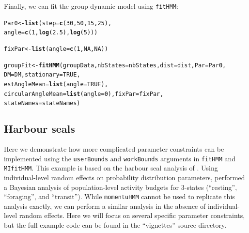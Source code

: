\documentclass[12pt]{article}\usepackage[]{graphicx}\usepackage[]{xcolor}
\makeatletter
\newcommand{\hlnum}[1]{\textcolor[rgb]{0.686,0.059,0.569}{#1}}%
\newcommand{\hldef}[1]{\textcolor[rgb]{0.345,0.345,0.345}{#1}}%
\newcommand{\hlkwb}[1]{\textcolor[rgb]{0.69,0.353,0.396}{#1}}%
\newcommand{\hlkwc}[1]{\textcolor[rgb]{0.333,0.667,0.333}{#1}}%
\newcommand{\hlkwd}[1]{\textcolor[rgb]{0.737,0.353,0.396}{\textbf{#1}}}%
\newenvironment{kframe}{%
 \def\at@end@of@kframe{}%
 \ifinner\ifhmode%
  \def\at@end@of@kframe{\end{minipage}}%
  \begin{minipage}{\columnwidth}%
 \fi\fi%
 \def\FrameCommand##1{\hskip\@totalleftmargin \hskip-\fboxsep
 \colorbox{shadecolor}{##1}\hskip-\fboxsep
     \hskip-\linewidth \hskip-\@totalleftmargin \hskip\columnwidth}%
 \MakeFramed {\advance\hsize-\width
   \@totalleftmargin\z@ \linewidth\hsize
   \@setminipage}}%
 {\par\unskip\endMakeFramed%
 \at@end@of@kframe}
\newenvironment{knitrout}{}{} %
\makeatother
\begin{document}
Finally, we can fit the group dynamic model using \verb|fitHMM|:
\begin{knitrout}
\color{fgcolor}\begin{kframe}
\begin{alltt}
\hldef{Par0} \hlkwb{<-} \hlkwd{list}\hldef{(}\hlkwc{step} \hldef{=} \hlkwd{c}\hldef{(}\hlnum{30}\hldef{,}\hlnum{50}\hldef{,}\hlnum{15}\hldef{,}\hlnum{25}\hldef{),}
             \hlkwc{angle} \hldef{=} \hlkwd{c}\hldef{(}\hlnum{1}\hldef{,}\hlkwd{log}\hldef{(}\hlnum{2.5}\hldef{),}\hlkwd{log}\hldef{(}\hlnum{5}\hldef{)))}

\hldef{fixPar} \hlkwb{<-} \hlkwd{list}\hldef{(}\hlkwc{angle}\hldef{=}\hlkwd{c}\hldef{(}\hlnum{1}\hldef{,}\hlnum{NA}\hldef{,}\hlnum{NA}\hldef{))}

\hldef{groupFit} \hlkwb{<-} \hlkwd{fitHMM}\hldef{(groupData,} \hlkwc{nbStates}\hldef{=nbStates,} \hlkwc{dist}\hldef{=dist,} \hlkwc{Par}\hldef{=Par0,}
                   \hlkwc{DM} \hldef{= DM,} \hlkwc{stationary} \hldef{=} \hlnum{TRUE}\hldef{,}
                   \hlkwc{estAngleMean} \hldef{=} \hlkwd{list}\hldef{(}\hlkwc{angle} \hldef{=} \hlnum{TRUE}\hldef{),}
                   \hlkwc{circularAngleMean} \hldef{=} \hlkwd{list}\hldef{(}\hlkwc{angle} \hldef{=} \hlnum{0}\hldef{),} \hlkwc{fixPar} \hldef{= fixPar,}
                   \hlkwc{stateNames} \hldef{= stateNames)}
\end{alltt}
\end{kframe}
\end{knitrout}

\subsection{Harbour seals}
\label{sec:harbourSeal}
Here we demonstrate how more complicated parameter constraints can be implemented using the \verb|userBounds| and \verb|workBounds| arguments in \verb|fitHMM| and \verb|MIfitHMM|. This example is based on the harbour seal analysis of \cite{McClintockEtAl2013c}. Using individual-level random effects on probability distribution parameters, \cite{McClintockEtAl2013c} performed a Bayesian analysis of population-level activity budgets for 3-states (``resting'', ``foraging'', and ``transit''). While \verb|momentuHMM| cannot be used to replicate this analysis exactly, we can perform a similar analysis in the absence of individual-level random effects. Here we will focus on several specific parameter constraints, but the full example code can be found in the ``vignettes'' source directory. 
\end{document}
